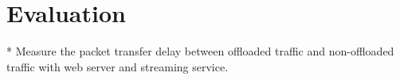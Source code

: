 \section{Evaluation}

* Measure the packet transfer delay between offloaded traffic and non-offloaded traffic with web server and streaming service.


